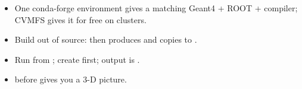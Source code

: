 \begin{recap}
\begin{itemize}
  \item One conda-forge environment gives a matching Geant4 + ROOT + compiler; CVMFS gives it for free on clusters.
  \item Build out of source:  then  produces  and copies  to .
  \item Run  from ; create  first; output is .
  \item {} before  gives you a 3-D picture.
\end{itemize}
\end{recap}
